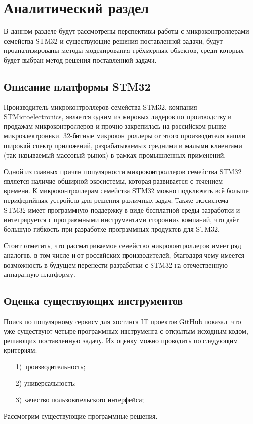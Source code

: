 \chapter{Аналитический раздел}
\label{cha:analysis}
%
%

В данном разделе будут рассмотрены перспективы работы с микроконтроллерами семейства STM32 и существующие решения поставленной задачи, 
будут проанализированы методы моделирования трёхмерных объектов, среди которых будет выбран метод решения поставленной задачи.

\section{Описание платформы STM32}

Производитель микроконтроллеров семейства STM32, компания STMicroelectronics, является одним из мировых лидеров по производству и продажам микроконтроллеров и прочно закрепилась на российском рынке микроэлектроники. 32-битные микроконтроллеры от этого производителя нашли широкий спектр приложений, разрабатываемых средними и малыми клиентами (так называемый массовый рынок) в рамках промышленных применений. \cite{STMicroelectronics_description}

Одной из главных причин популярности микроконтроллеров семейства STM32 является наличие обширной экосистемы, которая развивается с течением времени. К микроконтроллерам семейства STM32 можно подключать всё больше периферийных устройств для решения различных задач. Также экосистема STM32 имеет программную поддержку в виде бесплатной среды разработки и интегрируется с программными инструментами сторонних компаний, что даёт большую гибкость при разработке программных продуктов для STM32.

Стоит отметить, что рассматриваемое семейство микроконтроллеров имеет ряд аналогов, в том числе и от российских производителей, благодаря чему имеется возможность в будущем перенести разработки с STM32 на отечественную аппаратную платформу.

\section{Оценка существующих инструментов}

Поиск по популярному сервису для хостинга IT проектов GitHub \cite{git0} показал, что уже существуют четыре программных инструмента с открытым исходным кодом, решающих поставленную задачу. Их оценку можно проводить по следующим критериям:
\begin{enumerate}
	\item[1)] производительность;
	\item[2)] универсальность;
	\item[3)] качество пользовательского интерфейса;
\end{enumerate}
Рассмотрим существующие программные решения.

